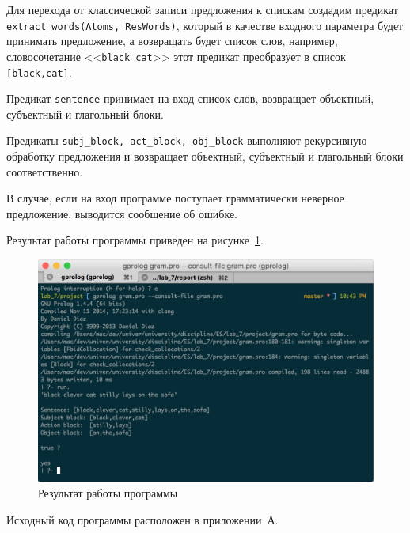 Для перехода от классической записи предложения к спискам создадим
предикат \texttt{extract\_words(Atoms, ResWords)}, который
в качестве входного параметра будет принимать предложение,
а возвращать будет список слов, например, словосочетание
<<\texttt{black cat}>> этот предикат преобразует в список \texttt{[black,cat]}.

Предикат \texttt{sentence} принимает на вход список слов,
возвращает объектный, субъектный и глагольный блоки.

Предикаты \texttt{subj\_block, act\_block, obj\_block} выполняют
рекурсивную обработку предложения и возвращает объектный, субъектный и
глагольный блоки соответственно.

В случае, если на вход программе поступает грамматически неверное предложение,
выводится сообщение об ошибке.

Результат работы программы приведен на рисунке~\ref{fig:results}.
\begin{figure}[h!]
  \centering
  \includegraphics[width=130mm]{img/results}
  \caption{Результат работы программы}
  \label{fig:results}
\end{figure}

Исходный код программы расположен в приложении~А.

\newpage